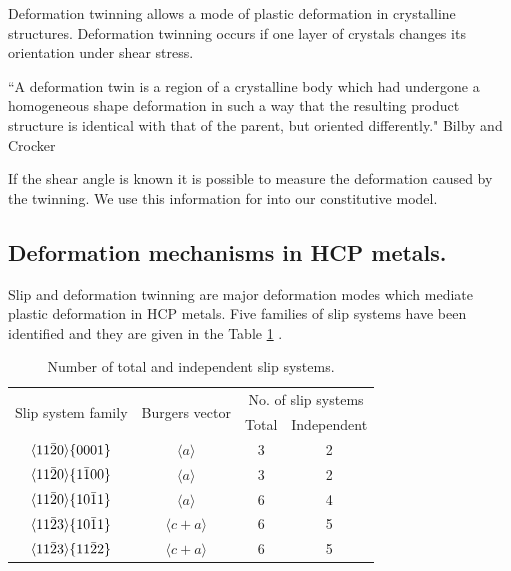 Deformation twinning allows a mode of plastic deformation in crystalline structures. Deformation twinning occurs if one layer of crystals changes its orientation under shear stress.

``A deformation twin is a region of a crystalline body which had undergone a homogeneous shape deformation in such a way that the resulting
product structure is identical with that of the parent, but oriented differently." Bilby and Crocker \cite{doi:10.1098/rspa.1965.0216}

If the shear angle is known it is possible to measure the deformation caused by the twinning. We use this information for into our constitutive model.


\subsection{Deformation mechanisms in HCP metals.}
Slip and deformation twinning are major deformation modes which mediate plastic deformation in HCP metals. 
Five families of slip systems have been identified and they are given in the Table \ref{Slip_systems} \cite{Partridge1967TheCA}.

\begin{table}[H]
\centering
\caption{Number of total and independent slip systems.}
\renewcommand\arraystretch{1.2}
\renewcommand\baselinestretch{1.2}
\begin{tabular}{|c|c|c|c|}
\hline
\multirow{2}{5em}{Slip system family} & \multirow{2}{3em}{Burgers vector} & \multicolumn{2}{c|}{No. of slip systems} \\
\cline{3-4}
 & & Total & Independent \\
 \hline
 $\langle11\Bar{2}0\rangle\{0001\}$ & $\langle a \rangle$ & 3 & 2 \\
 $\langle11\Bar{2}0\rangle\{1\Bar{1}00\}$ & $\langle a \rangle$ & 3 & 2 \\
 $\langle11\Bar{2}0\rangle\{10\Bar{1}1\}$ & $\langle a \rangle$ & 6 & 4 \\
 $\langle11\Bar{2}3\rangle\{10\Bar{1}1\}$ & $\langle c+a \rangle$ & 6 & 5 \\
 $\langle11\Bar{2}3\rangle\{11\Bar{2}2\}$ & $\langle c+a \rangle$ & 6 & 5 \\
 \hline
\end{tabular}

\label{Slip_systems}
\end{table}

